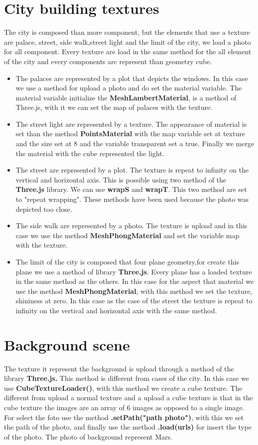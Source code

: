 \documentclass[a4paper, 11pt, titlepage]{report}
\begin{document}
	\section{City building textures}
		The city is composed than more component, but the elements that use a texture are palace, street, side walk,street light and the limit of the city, we load a photo for all component. Every texture are load in the same method for the all element of the city and every components are represent than geometry cube.
		\begin{itemize}
			\item The palaces are represented by a plot that depicts the windows. In this case we use a method for upload a photo and do set the  material variable. The material variable initialize the \textbf{MeshLambertMaterial}, is a method of Three.js, with it we can set the map of palaces with the texture. 
			\item The street light are represented by a texture. The appearance of material is set than the method\textbf{ PointsMaterial} with the  map variable set at texture and the size set at 8 and the variable transparent set a true. Finally we merge the material with the cube  represented the light.
			\item The street are represented by a plot. The texture is repeat to infinity on the vertical and horizontal axis. This is possible using two method of the \textbf{Three.js} library. We can use \textbf{wrapS} and \textbf{wrapT}.  This two method are set to "repeat wrapping". These methods have been used because the photo was depicted too close.
			\item The side walk are represented by a photo. The texture is upload and in this case we use the method \textbf{MeshPhongMaterial} and set the variable map with the texture.
			\item The limit of the city is composed that four plane geometry,for create this plane we use a method of library \textbf{Three.js}. Every plane has a  loaded texture in the same method as the others. In this case for the aspect that  material we use the  method\textbf{ MeshPhongMaterial}, with this method we set the texture, shininess at zero. In this case as the case of the street the texture is repeat to infinity on the vertical and horizontal  axis with the same method. 
		\end{itemize}

 	\section{Background scene}
		The texture it represent the background is upload through a method of the library\textbf{ Three.js.} This method is different from cases of the city. In this case we use\textbf{ CubeTextureLoader()}, with this method we create a cube texture. The different from upload a normal texture and a upload a cube texture is that in  the cube texture the images are an array of 6 images as opposed to a single image.
		For select the foto use the method \textbf{.setPath("path photo")}, with this we set the path of the photo, and finally use the method \textbf{.load(urls)} for insert the type of the photo. The photo of background represent Mars.
\end{document}
